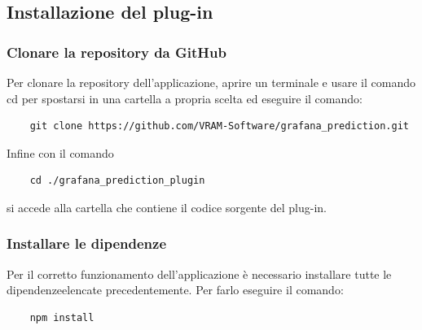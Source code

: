 
\subsection{Installazione del plug-in}
\subsubsection{Clonare la repository da GitHub}%
Per clonare la repository dell'applicazione, aprire un terminale e usare il comando cd per spostarsi in una cartella a propria scelta ed eseguire il comando:
\begin{verbatim}
	git clone https://github.com/VRAM-Software/grafana_prediction.git
\end{verbatim}
Infine con il comando 
\begin{verbatim}
	cd ./grafana_prediction_plugin
\end{verbatim}
si accede alla cartella che contiene il codice sorgente del plug-in.

\subsubsection{Installare le dipendenze\glo}%
Per il corretto funzionamento dell'applicazione è necessario installare tutte le dipendenze\glosp elencate precedentemente. Per farlo eseguire il comando:
\begin{verbatim}
	npm install
\end{verbatim}

